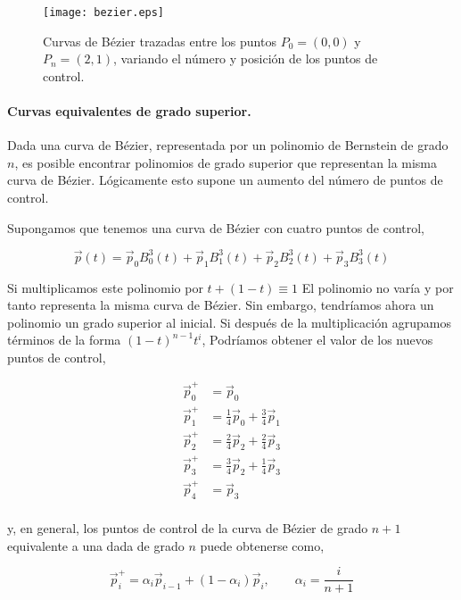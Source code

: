 \begin{figure}[h]
\centering
\texttt{[image: bezier.eps]} 
\caption{Curvas de Bézier trazadas entre los puntos $P_0 = (0,0)$ y $P_n = (2,1)$, variando el número y posición de los puntos de control.} 
\label{fig:bezier}
\end{figure}
\begin{paracol}{2}
\paragraph{Curvas equivalentes de grado superior.} Dada una curva de Bézier, representada por un polinomio de Bernstein de grado $n$, es posible encontrar polinomios de grado superior que representan la misma curva de Bézier. Lógicamente esto supone un aumento del número de puntos de control.

Supongamos que tenemos una curva de Bézier con cuatro puntos de control,
\end{paracol}
\begin{equation*}
\vec{p}(t) = \vec{p}_0B_0^3(t) + \vec{p}_1B_1^3(t) + \vec{p}_2B_2^3(t) + \vec{p}_3B_3^3(t)
\end{equation*}
\begin{paracol}{2}
Si multiplicamos este polinomio por $ t + (1 -t) \equiv 1$ El polinomio no varía y por tanto representa la misma curva de Bézier. Sin embargo, tendríamos ahora un polinomio un grado superior al inicial.  Si después de la multiplicación agrupamos términos de la forma $(1-t)^{n-1}t^i$, Podríamos obtener el valor de los nuevos puntos de control,
\end{paracol}
\begin{align*}
\vec{p}_0^+&= \vec{p}_0\\
\vec{p}_1^+&= \frac{1}{4}\vec{p}_0 + \frac{3}{4}\vec{p}_1\\
\vec{p}_2^+&= \frac{2}{4}\vec{p}_2 + \frac{2}{4}\vec{p}_3\\
\vec{p}_3^+&= \frac{3}{4}\vec{p}_2 + \frac{1}{4}\vec{p}_3\\
\vec{p}_4^+&= \vec{p}_3\\
\end{align*}
\begin{paracol}{2}
y, en general, los puntos de control de la curva de Bézier de grado $n+1$ equivalente  a una dada de grado $n$ puede obtenerse como,
\end{paracol}
\begin{equation*}
\vec{p}_i^+ = \alpha_i\vec{p}_{i-1} + (1-\alpha_i)\vec{p}_i, \qquad \alpha_i =\frac{i}{n+1}
\end{equation*}
